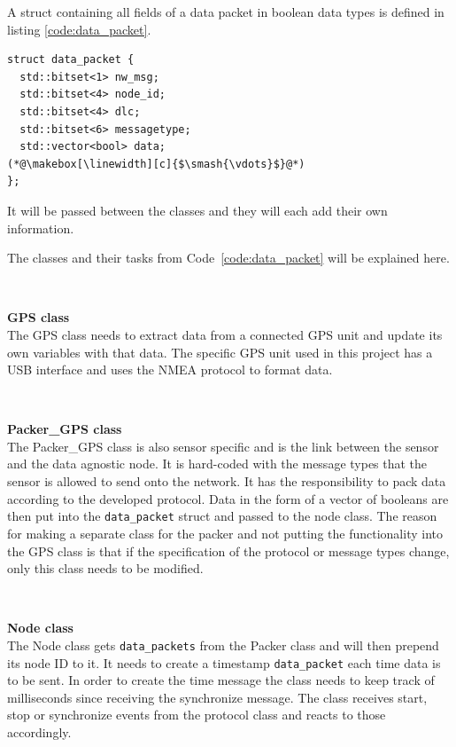 A struct containing all fields of a data packet in boolean data types is defined in listing \ref{code:data_packet}.  

\begin{lstlisting}[caption=Struct for data packet.,label=code:data_packet]
struct data_packet {
  std::bitset<1> nw_msg;
  std::bitset<4> node_id;
  std::bitset<4> dlc;
  std::bitset<6> messagetype;
  std::vector<bool> data; 
(*@\makebox[\linewidth][c]{$\smash{\vdots}$}@*)
};
\end{lstlisting}
It will be passed between the classes and they will each add their own information. 

The classes and their tasks from Code~\ref{code:data_packet} will be explained here.

~\\ \par \textbf{GPS class} ~ \\
The GPS class needs to extract data from a connected GPS unit and update its own variables with that data.
The specific GPS unit used in this project has a USB interface and uses the NMEA protocol to format data.

~\\ \par \textbf{Packer\_GPS class} ~ \\
The Packer\_GPS class is also sensor specific and is the link between the sensor and the data agnostic node.
It is hard-coded with the message types that the sensor is allowed to send onto the network.
It has the responsibility to pack data according to the developed protocol.
Data in the form of a vector of booleans are then put into the \texttt{data\_packet} struct and passed to the node class.
The reason for making a separate class for the packer and not putting the functionality into the GPS class is that if the specification of the protocol or message types change, only this class needs to be modified.

~\\ \par \textbf{Node class} ~ \\
The Node class gets \texttt{data\_packets} from the Packer class and will then prepend its node ID to it.
It needs to create a timestamp \texttt{data\_packet} each time data is to be sent.
In order to create the time message the class needs to keep track of milliseconds since receiving the synchronize message.
The class receives start, stop or synchronize events from the protocol class and reacts to those accordingly.

